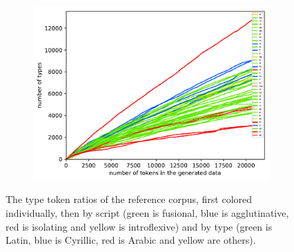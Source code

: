\documentclass[11pt,a4paper,twoside,openright]{scrbook}
\begin{document}
\begin{figure}[h]
\begin{subfigure}[b]{0.32\textwidth}
        \includegraphics[width=\textwidth]{graphs/gensize_huge_types_morph_types}
    \end{subfigure}
    \caption{The type token ratios of the reference corpus, first colored individually, then by script (green is fusional, blue is agglutinative, red is isolating and yellow is introflexive) and by type (green is Latin, blue is Cyrillic, red is Arabic and yellow are others).}
    \label{Figure:gensize_huge_types}
\end{figure}
\end{document}
